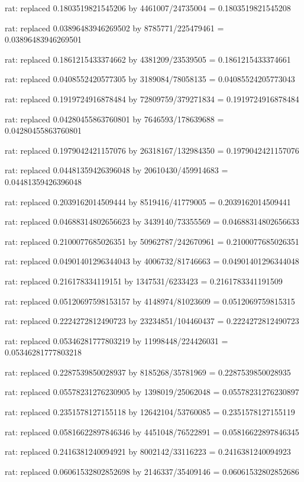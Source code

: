 \documentclass[a4paper,10pt]{article}
\begin{document}
\begin{eulernotebook}
\begin{eulercomment}
\begin{eulercomment}
\begin{eulercomment}
\begin{eulercomment}
\begin{eulercomment}
\begin{eulercomment}
\begin{eulercomment}
\begin{eulercomment}
\begin{eulercomment}
\begin{eulercomment}
\begin{eulercomment}
\begin{eulercomment}
\begin{eulercomment}
\begin{eulercomment}
\begin{eulercomment}
\begin{eulercomment}
\begin{euleroutput}
  rat: replaced 0.1803519821545206 by 4461007/24735004 = 0.1803519821545208
  
  rat: replaced 0.03896483946269502 by 8785771/225479461 = 0.03896483946269501
  
  rat: replaced 0.1861215433374662 by 4381209/23539505 = 0.1861215433374661
  
  rat: replaced 0.0408552420577305 by 3189084/78058135 = 0.04085524205773043
  
  rat: replaced 0.1919724916878484 by 72809759/379271834 = 0.1919724916878484
  
  rat: replaced 0.04280455863760801 by 7646593/178639688 = 0.04280455863760801
  
  rat: replaced 0.1979042421157076 by 26318167/132984350 = 0.1979042421157076
  
  rat: replaced 0.04481359426396048 by 20610430/459914683 = 0.04481359426396048
  
  rat: replaced 0.2039162014509444 by 8519416/41779005 = 0.2039162014509441
  
  rat: replaced 0.04688314802656623 by 3439140/73355569 = 0.04688314802656633
  
  rat: replaced 0.2100077685026351 by 50962787/242670961 = 0.2100077685026351
  
  rat: replaced 0.04901401296344043 by 4006732/81746663 = 0.04901401296344048
  
  rat: replaced 0.216178334119151 by 1347531/6233423 = 0.2161783341191509
  
  rat: replaced 0.05120697598153157 by 4148974/81023609 = 0.0512069759815315
  
  rat: replaced 0.2224272812490723 by 23234851/104460437 = 0.2224272812490723
  
  rat: replaced 0.05346281777803219 by 11998448/224426031 = 0.05346281777803218
  
  rat: replaced 0.2287539850028937 by 8185268/35781969 = 0.2287539850028935
  
  rat: replaced 0.05578231276230905 by 1398019/25062048 = 0.05578231276230897
  
  rat: replaced 0.2351578127155118 by 12642104/53760085 = 0.2351578127155119
  
  rat: replaced 0.05816622897846346 by 4451048/76522891 = 0.05816622897846345
  
  rat: replaced 0.2416381240094921 by 8002142/33116223 = 0.2416381240094923
  
  rat: replaced 0.06061532802852698 by 2146337/35409146 = 0.06061532802852686
  

\end{euleroutput}
\end{eulercomment}
\end{eulercomment}
\end{eulercomment}
\end{eulercomment}
\end{eulercomment}
\end{eulercomment}
\end{eulercomment}
\end{eulercomment}
\end{eulercomment}
\end{eulercomment}
\end{eulercomment}
\end{eulercomment}
\end{eulercomment}
\end{eulercomment}
\end{eulercomment}
\end{eulercomment}
\end{eulernotebook}
\end{document}
